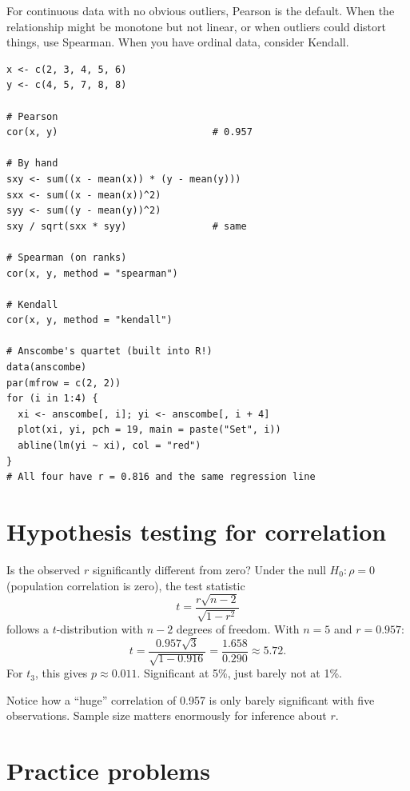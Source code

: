 For continuous data with no obvious outliers, Pearson is the default. When the relationship might be monotone but not linear, or when outliers could distort things, use Spearman. When you have ordinal data, consider Kendall.

\begin{codelab}
\begin{lstlisting}[language=Rlang]
x <- c(2, 3, 4, 5, 6)
y <- c(4, 5, 7, 8, 8)

# Pearson
cor(x, y)                           # 0.957

# By hand
sxy <- sum((x - mean(x)) * (y - mean(y)))
sxx <- sum((x - mean(x))^2)
syy <- sum((y - mean(y))^2)
sxy / sqrt(sxx * syy)               # same

# Spearman (on ranks)
cor(x, y, method = "spearman")

# Kendall
cor(x, y, method = "kendall")

# Anscombe's quartet (built into R!)
data(anscombe)
par(mfrow = c(2, 2))
for (i in 1:4) {
  xi <- anscombe[, i]; yi <- anscombe[, i + 4]
  plot(xi, yi, pch = 19, main = paste("Set", i))
  abline(lm(yi ~ xi), col = "red")
}
# All four have r = 0.816 and the same regression line
\end{lstlisting}
\end{codelab}

\section{Hypothesis testing for correlation}

Is the observed $r$ significantly different from zero? Under the null $H_0\colon \rho = 0$ (population correlation is zero), the test statistic
\begin{equation}
  t = \frac{r\sqrt{n-2}}{\sqrt{1-r^2}}
  \label{eq:t-test-r}
\end{equation}
follows a $t$-distribution with $n - 2$ degrees of freedom. With $n = 5$ and $r = 0.957$:
\[
  t = \frac{0.957\sqrt{3}}{\sqrt{1 - 0.916}} = \frac{1.658}{0.290} \approx 5.72.
\]
For $t_3$, this gives $p \approx 0.011$. Significant at 5\%, just barely not at 1\%.

Notice how a ``huge'' correlation of 0.957 is only barely significant with five observations. Sample size matters enormously for inference about $r$.

\section{Practice problems}

